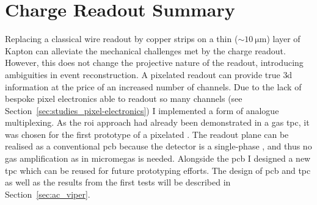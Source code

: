 \section{Charge Readout Summary}
\label{sec:studies_charge-ro-summary}

Replacing a classical wire readout by copper strips on a thin ($\sim \SI{10}{\micro\metre}$) layer of Kapton can alleviate the mechanical challenges met by the charge readout.
However, this does not change the projective nature of the readout, introducing ambiguities in event reconstruction.
A pixelated readout can provide true \gls{3d} information at the price of an increased number of channels.
Due to the lack of bespoke pixel electronics able to readout so many channels (see Section~\ref{sec:studies_pixel-electronics}) I implemented a form of analogue multiplexing.
As the \gls{roi} approach had already been demonstrated in a gas \gls{tpc}, it was chosen for the first prototype of a pixelated \lartpc{}.
The readout plane can be realised as a conventional \gls{pcb} because the detector is a single-phase \lartpc{}, and thus no gas amplification as in \gls{micromegas} is needed.
Alongside the \gls{pcb} I designed a new \gls{tpc} which can be reused for future prototyping efforts.
The design of \gls{pcb} and \gls{tpc} as well as the results from the first tests will be described in Section~\ref{sec:ac_viper}.
